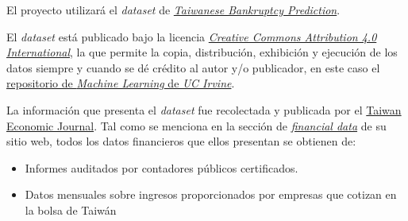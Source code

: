 \documentclass[
11pt, %
]{charter}
\begin{document}


El proyecto utilizará el \textit{dataset} de \href{https://archive.ics.uci.edu/dataset/572/taiwanese+bankruptcy+prediction}{\textit{Taiwanese Bankruptcy Prediction}}.

El \textit{dataset} está publicado bajo la licencia \href{https://creativecommons.org/licenses/by/4.0/legalcode}{\textit{Creative Commons Attribution 4.0 International}}, la que permite la copia, distribución, exhibición y ejecución de los datos siempre y cuando se dé crédito al autor y/o publicador, en este caso el \href{https://archive.ics.uci.edu/}{repositorio de \textit{Machine Learning} de \textit{UC Irvine}}.

La información que presenta el \textit{dataset} fue recolectada y publicada por el \href{https://www.tejwin.com/en/}{Taiwan Economic Journal}. Tal como se menciona en la sección de \href{https://www.tejwin.com/en/solution/financial-data/}{\textit{financial data}} de su sitio web, todos los datos financieros que ellos presentan se obtienen de:
\begin{itemize}
    \item Informes auditados por contadores públicos certificados.
    \item Datos mensuales sobre ingresos proporcionados por empresas que cotizan en la bolsa de Taiwán
\end{itemize}
\end{document}
